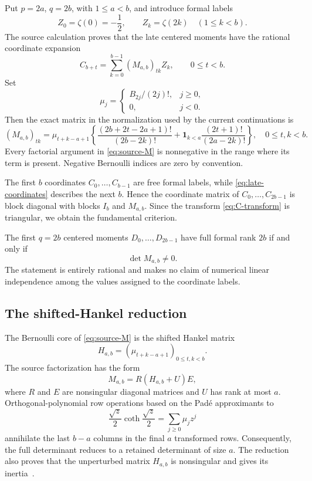 Put $p=2a$, $q=2b$, with $1\le a<b$, and introduce formal labels
\[
 Z_0=\zeta(0)=-\frac12,
 \qquad Z_k=\zeta(2k)\quad(1\le k<b).
\]
The source calculation proves that the late centered moments have the
rational coordinate expansion
\begin{equation}
 C_{b+t}=\sum_{k=0}^{b-1}(M_{a,b})_{tk}Z_k,
 \qquad 0\le t<b.
 \label{eq:late-coordinates}
\end{equation}
Set
\[
 \mu_j=
 \begin{cases}
 B_{2j}/(2j)!,&j\ge0,\\
 0,&j<0.
 \end{cases}
\]
Then the exact matrix in the normalization used by the current
continuations is
\begin{equation}
 (M_{a,b})_{tk}=\mu_{t+k-a+1}
 \left\{
 \frac{(2b+2t-2a+1)!}{(2b-2k)!}
 +\mathbf1_{k<a}\frac{(2t+1)!}{(2a-2k)!}
 \right\},
 \quad 0\le t,k<b.
 \label{eq:source-M}
\end{equation}
Every factorial argument in \eqref{eq:source-M} is nonnegative in the
range where its term is present.  Negative Bernoulli indices are zero
by convention.

The first $b$ coordinates $C_0,\ldots,C_{b-1}$ are free formal labels,
while \eqref{eq:late-coordinates} describes the next $b$.  Hence the
coordinate matrix of $C_0,\ldots,C_{2b-1}$ is block diagonal with
blocks $I_b$ and $M_{a,b}$.  Since the transform
\eqref{eq:C-transform} is triangular, we obtain the fundamental
criterion.

\begin{proposition}
\label{prop:rank-criterion}
The first $q=2b$ centered moments $D_0,\ldots,D_{2b-1}$ have full
formal rank $2b$ if and only if
\[
 \det M_{a,b}\ne0.
\]
The statement is entirely rational and makes no claim of numerical
linear independence among the values assigned to the coordinate
labels.
\end{proposition}

\subsection{The shifted-Hankel reduction}

The Bernoulli core of \eqref{eq:source-M} is the shifted Hankel matrix
\begin{equation}
 H_{a,b}=(\mu_{t+k-a+1})_{0\le t,k<b}.
 \label{eq:H}
\end{equation}
The source factorization has the form
\[
 M_{a,b}=R(H_{a,b}+U)E,
\]
where $R$ and $E$ are nonsingular diagonal matrices and $U$ has rank at
most $a$.  Orthogonal-polynomial row operations based on the Pad\'e
approximants to
\[
 \frac{\sqrt z}{2}\coth\frac{\sqrt z}{2}
   =\sum_{j\ge0}\mu_jz^j
\]
annihilate the last $b-a$ columns in the final $a$ transformed rows.
Consequently, the full determinant reduces to a retained determinant of
size $a$.  The reduction also proves that the unperturbed matrix
$H_{a,b}$ is nonsingular and gives its inertia~\cite{BTD,QSR,DilcherJiu2022,DilcherJiu2023}.

